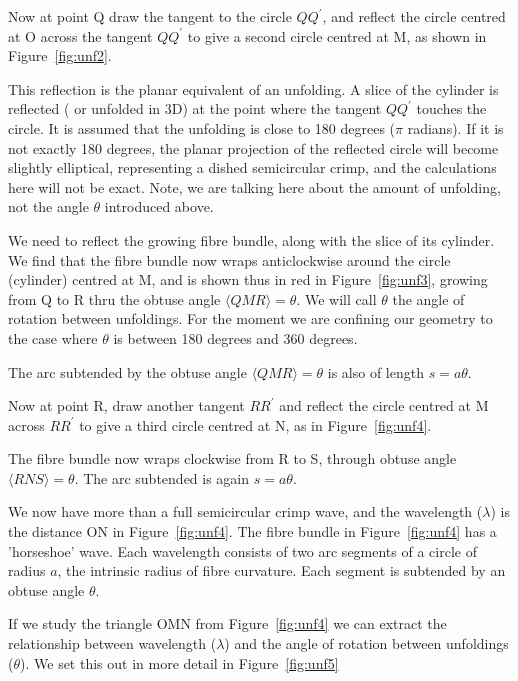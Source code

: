 \documentclass[titlepage,10pt]{article}  %
\begin{document}
Now at point Q draw the tangent to the circle $Q Q^{'}$, and reflect the circle centred at O across the tangent $Q Q^{'}$ to give a second circle centred at M, as shown in Figure~\ref{fig:unf2}.



This reflection is the planar equivalent of an unfolding. A slice of the cylinder is reflected ( or unfolded in 3D) at the point where the tangent $QQ^{'}$ touches the circle. It is assumed that the unfolding is close to 180 degrees ($\pi$ radians). If it is not exactly 180 degrees, the planar projection of the reflected circle will become slightly elliptical, representing a dished semicircular crimp, and the calculations here will not be exact. Note, we are talking here about the amount of unfolding, not the angle $\theta$ introduced above.

We need to reflect the growing fibre bundle, along with the slice of its cylinder. We find that the fibre bundle now wraps anticlockwise around the circle (cylinder) centred at M, and is shown thus in red in Figure~\ref{fig:unf3}, growing from Q to R thru the obtuse angle $\langle QMR \rangle = \theta$.
We will call $\theta$ the angle of rotation between unfoldings.
For the moment we are confining our geometry to the case where $\theta$ is between 180 degrees and 360 degrees. 



The arc subtended by the obtuse angle $\langle QMR \rangle = \theta$ is also of length $s = a \theta$.

Now at point R, draw another tangent $RR^{'}$ and reflect the circle centred at M across $RR^{'}$ to give a third circle centred at N, as in Figure~\ref{fig:unf4}.



 The fibre bundle now wraps clockwise from R to S, through obtuse angle $\langle RNS \rangle = \theta$. The arc subtended is again $s = a \theta$.

We now have more than a full semicircular crimp wave, and the wavelength ($\lambda$) is the distance ON in Figure~\ref{fig:unf4}. The fibre bundle in Figure~\ref{fig:unf4} has a 'horseshoe' wave. Each wavelength consists of two arc segments of a circle of radius $a$, the intrinsic radius of fibre curvature. Each segment is subtended by an obtuse angle $\theta$.

 If we study the triangle OMN from Figure~\ref{fig:unf4} we can extract the relationship between wavelength ($\lambda$) and the angle of rotation between unfoldings ($\theta$). We set this out in more detail in Figure~\ref{fig:unf5}
\end{document}
